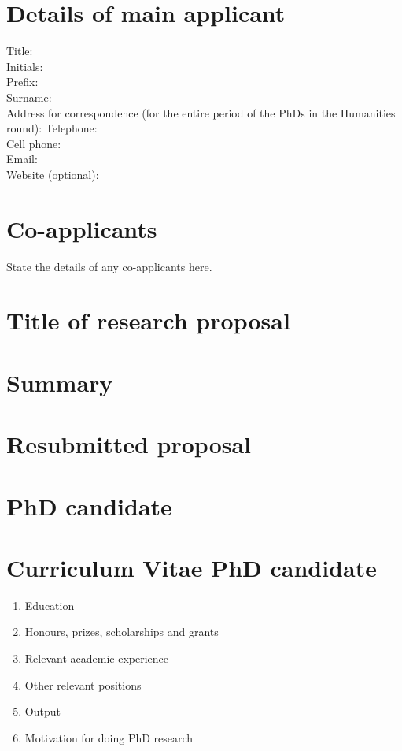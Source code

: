 \documentclass{article}
\begin{document}
\section{Details of main applicant}
Title: \\
Initials: \\
Prefix: \\ 
Surname: \\
Address for correspondence (for the entire period of the PhDs in the Humanities round):
Telephone: \\
Cell phone: \\
Email: \\
Website (optional):

\section{Co-applicants}
State the details of any co-applicants here.

\section{Title of research proposal}

\section{Summary}

\section{Resubmitted proposal}

\section{PhD candidate}

\section{Curriculum Vitae PhD candidate}

\begin{enumerate}[label=(\alph*)]
\item Education
\item Honours, prizes, scholarships and grants
\item Relevant academic experience
\item Other relevant positions
\item Output
\item Motivation for doing PhD research
\end{enumerate}
\end{document}
